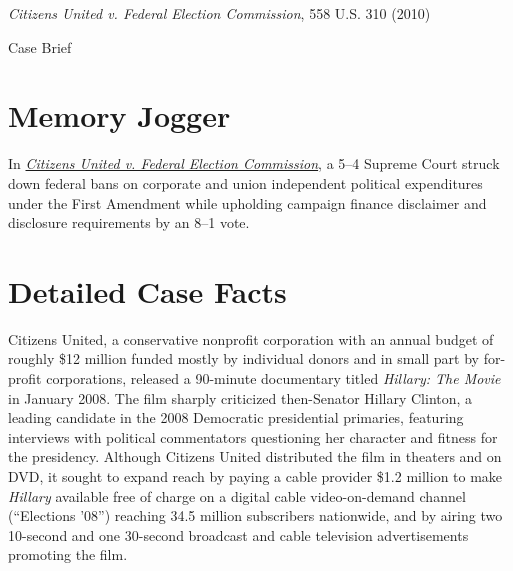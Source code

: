 \documentclass[12pt]{article}
\begin{document}
\begin{center}
{\LARGE \textit{Citizens United v. Federal Election Commission}, 558 U.S. 310 (2010)\par}
\vspace{0.8em}
{\large Case Brief\par}
\end{center}
\vspace{1em}

\section{Memory Jogger}

In \href{https://www.courtlistener.com/opinion/1741/citizens-united-v-federal-election-commission/}{\textit{Citizens United v. Federal Election Commission}}, a 5--4 Supreme Court struck down federal bans on corporate and union independent political expenditures under the First Amendment while upholding campaign finance disclaimer and disclosure requirements by an 8--1 vote.

\section{Detailed Case Facts}

Citizens United, a conservative nonprofit corporation with an annual budget of roughly \$12 million funded mostly by individual donors and in small part by for-profit corporations, released a 90-minute documentary titled \textit{Hillary: The Movie} in January 2008. The film sharply criticized then-Senator Hillary Clinton, a leading candidate in the 2008 Democratic presidential primaries, featuring interviews with political commentators questioning her character and fitness for the presidency. Although Citizens United distributed the film in theaters and on DVD, it sought to expand reach by paying a cable provider \$1.2 million to make \textit{Hillary} available free of charge on a digital cable video-on-demand channel (``Elections '08'') reaching 34.5 million subscribers nationwide, and by airing two 10-second and one 30-second broadcast and cable television advertisements promoting the film.
\end{document}
